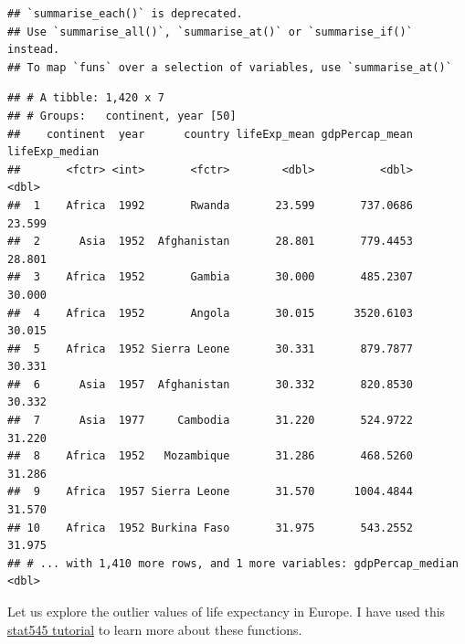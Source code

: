 \documentclass[]{article}
\newenvironment{Shaded}{\begin{snugshade}}{\end{snugshade}}
\newcommand{\KeywordTok}[1]{\textcolor[rgb]{0.13,0.29,0.53}{\textbf{{#1}}}}
\newcommand{\DataTypeTok}[1]{\textcolor[rgb]{0.13,0.29,0.53}{{#1}}}
\newcommand{\DecValTok}[1]{\textcolor[rgb]{0.00,0.00,0.81}{{#1}}}
\newcommand{\StringTok}[1]{\textcolor[rgb]{0.31,0.60,0.02}{{#1}}}
\newcommand{\OtherTok}[1]{\textcolor[rgb]{0.56,0.35,0.01}{{#1}}}
\newcommand{\NormalTok}[1]{{#1}}
\begin{document}
\begin{verbatim}
## `summarise_each()` is deprecated.
## Use `summarise_all()`, `summarise_at()` or `summarise_if()` instead.
## To map `funs` over a selection of variables, use `summarise_at()`
\end{verbatim}

\begin{verbatim}
## # A tibble: 1,420 x 7
## # Groups:   continent, year [50]
##    continent  year      country lifeExp_mean gdpPercap_mean lifeExp_median
##       <fctr> <int>       <fctr>        <dbl>          <dbl>          <dbl>
##  1    Africa  1992       Rwanda       23.599       737.0686         23.599
##  2      Asia  1952  Afghanistan       28.801       779.4453         28.801
##  3    Africa  1952       Gambia       30.000       485.2307         30.000
##  4    Africa  1952       Angola       30.015      3520.6103         30.015
##  5    Africa  1952 Sierra Leone       30.331       879.7877         30.331
##  6      Asia  1957  Afghanistan       30.332       820.8530         30.332
##  7      Asia  1977     Cambodia       31.220       524.9722         31.220
##  8    Africa  1952   Mozambique       31.286       468.5260         31.286
##  9    Africa  1957 Sierra Leone       31.570      1004.4844         31.570
## 10    Africa  1952 Burkina Faso       31.975       543.2552         31.975
## # ... with 1,410 more rows, and 1 more variables: gdpPercap_median <dbl>
\end{verbatim}

Let us explore the outlier values of life expectancy in Europe. I have
used this
\href{http://stat545.com/block010_dplyr-end-single-table.html}{stat545
tutorial} to learn more about these functions.

\begin{Shaded}
\end{Shaded}
\end{document}
